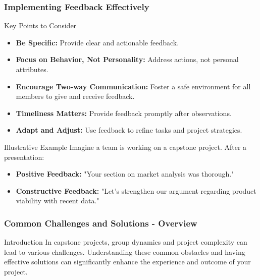 \documentclass[aspectratio=169]{beamer}
\begin{document}
\begin{frame}[fragile]
    \frametitle{Implementing Feedback Effectively}
    \begin{block}{Key Points to Consider}
        \begin{itemize}
            \item \textbf{Be Specific:} Provide clear and actionable feedback.
            \item \textbf{Focus on Behavior, Not Personality:} Address actions, not personal attributes.
            \item \textbf{Encourage Two-way Communication:} Foster a safe environment for all members to give and receive feedback.
            \item \textbf{Timeliness Matters:} Provide feedback promptly after observations.
            \item \textbf{Adapt and Adjust:} Use feedback to refine tasks and project strategies.
        \end{itemize}
    \end{block}
    
    \begin{block}{Illustrative Example}
        Imagine a team is working on a capstone project. After a presentation:
        \begin{itemize}
            \item \textbf{Positive Feedback:} "Your section on market analysis was thorough."
            \item \textbf{Constructive Feedback:} "Let's strengthen our argument regarding product viability with recent data."
        \end{itemize}
    \end{block}
\end{frame}

\begin{frame}[fragile]
    \frametitle{Common Challenges and Solutions - Overview}
    \begin{block}{Introduction}
    In capstone projects, group dynamics and project complexity can lead to various challenges. Understanding these common obstacles and having effective solutions can significantly enhance the experience and outcome of your project.
    \end{block}
\end{frame}
\end{document}

